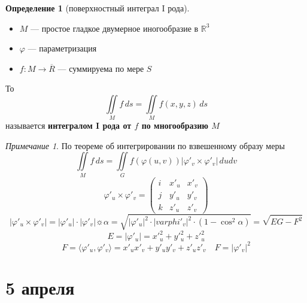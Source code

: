 \documentclass[oneside]{book}
\newcommand{\R}{\mathbb{R}}
\newcommand{\A}{\mathfrak{A}}
\theoremstyle{plain}
\theoremstyle{remark}
\newtheorem*{remark}{Примечание}
\theoremstyle{definition}
\newtheorem*{definition}{Определение}
\begin{document}
\begin{definition}[поверхностный интеграл I рода]
\-
\begin{itemize}
\item \(M\) --- простое гладкое двумерное иногообразие в \(\R^3\)
\item \(\varphi\) --- параметризация
\item \(f: M \to \overline{R}\) --- суммируема по мере \(S\)
\end{itemize}
То \[ \iint\limits_M f\,ds = \iint\limits_M f(x, y, z)\,ds \]
называется \textbf{интегралом I рода от \(f\) по многообразию \(M\)}
\end{definition}
\begin{remark}
По теореме об интегрировании по взвешенному образу меры
\[ \iint\limits_M f\,ds = \iint\limits_G f(\varphi(u, v)) |\varphi'_v \times \varphi'_v|\,dudv \]
\[ \varphi'_u \times \varphi'_v = \begin{pmatrix}
i & x'_u & x'_v \\
j & y'_u & y'_v \\
k & z'_u & z'_v
\end{pmatrix}\]
\[ |\varphi'_u \times \varphi'_v| = |\varphi'_u| \cdot |\varphi'_v|\sun\alpha = \sqrt{|\varphi'_u|^2 \cdot |varphi'_v|^2 \cdot (1 - \cos^2\alpha)} = \sqrt{EG - F^2} \]
\[ E = |\varphi'_u| = x'_u^2 + y'_u^2 + z'_u^2 \]
\[ F = \langle \varphi'_u, \varphi'_v \rangle = x'_ux'_v + y'_uy'_v + z'_u z'_v \quad F = |\varphi'_v|^2 \]
\end{remark}
\chapter{5 апреля}
\label{sec:orgc7c5985}
\newcommand{\A}{\mathfrak{A}}
\newcommand{\esssup}{\mathop{\rm ess\,sup}\limits}
\end{document}

